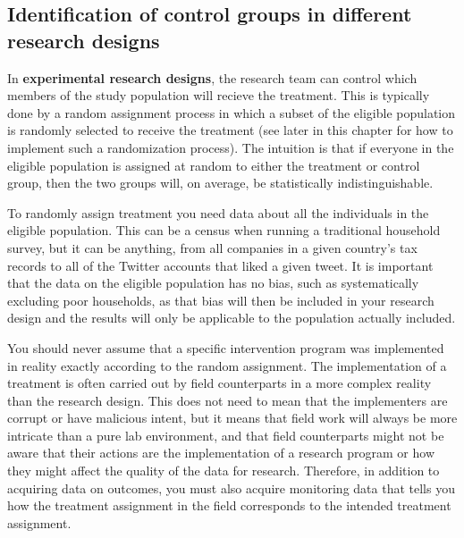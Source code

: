 \subsection{Identification of control groups in different research designs}


In \textbf{experimental research designs},
 
the research team can control which members
of the study population will recieve the treatment.
This is typically done by a random assignment process
in which a subset of the eligible population
is randomly selected to receive the treatment
(see later in this chapter for how to implement such a randomization process).
The intuition is that if everyone in the eligible population
is assigned at random to either the treatment or control group,
then the two groups will, on average, be statistically indistinguishable.

To randomly assign treatment you need data
about all the individuals in the eligible population.
This can be a census when running a traditional household survey,
but it can be anything, from all companies in a given country's tax records
to all of the Twitter accounts that liked a given tweet.
It is important that the data on the eligible population has no bias,
such as systematically excluding poor households,
as that bias will then be included in your research design
and the results will only be applicable to the population actually included.

You should never assume that a specific intervention program
was implemented in reality exactly according to the random assignment.
The implementation of a treatment is often carried out
by field counterparts in a more complex reality than the research design.
This does not need to mean that the implementers are corrupt or have malicious intent,
but it means that field work will always be more intricate than a pure lab environment,
and that field counterparts might not be aware
that their actions are the implementation of a research program
or how they might affect the quality of the data for research.
Therefore, in addition to acquiring data on outcomes,
you must also acquire monitoring data
that tells you how the treatment assignment in the field
corresponds to the intended treatment assignment.

